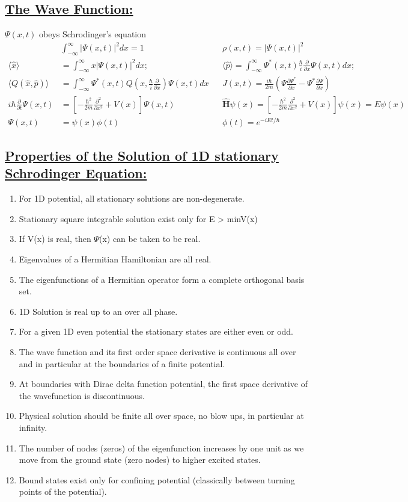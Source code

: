 \documentclass[a4paper,12pt]{article}
\begin{document}
\subsection*{\underline{The Wave Function:}}
$\Psi(x,t)$ obeys Schrodinger's equation
\begin{align*}
    &\int_{-\infty}^\infty |\Psi(x,t)|^2dx=1&& \rho(x,t)=|\Psi(x,t)|^2\\
    \langle \hat{x}\rangle&=\int_{-\infty}^\infty x|\Psi(x,t)|^2dx;&&\langle \hat{p}\rangle=\int_{-\infty}^\infty \Psi^*(x,t)\frac{\hbar}{i}\frac{\partial}{\partial x}\Psi(x,t)dx;\\
    \langle Q(\hat{x},\hat{p})\rangle&=\int_{-\infty}^\infty \Psi^*(x,t)Q(x,\frac{\hbar}{i}\frac{\partial}{\partial x})\Psi(x,t)dx&&J(x,t)=\frac{i\hbar}{2m}\left( \Psi\frac{\partial \Psi^*}{\partial x}-\Psi^*\frac{\partial \Psi}{\partial x} \right)\\
    i\hbar \frac{\partial }{\partial t}\Psi(x,t)&=\left[ -\frac{\hbar^2}{2m}\frac{\partial^2}{\partial x^2}+V(x) \right] \Psi(x,t)&&\mathbf{\hat{H}}\psi(x)=\left[ -\frac{\hbar^2}{2m}\frac{\partial^2}{\partial x^2}+V(x) \right] \psi(x)=E\psi(x)\\
    \Psi(x,t)&=\psi(x)\phi(t)&&\phi(t)=e^{-iEt/\hbar} 
\end{align*}
\subsection*{\underline{Properties of the Solution of 1D stationary Schrodinger Equation:}}

\begin{enumerate}
\item For 1D potential, all stationary solutions are non-degenerate.
\item Stationary square integrable solution exist only for E > min{V(x)} 
\item If V(x) is real, then $\Psi$(x) can be taken to be real.
\item Eigenvalues of a Hermitian Hamiltonian are all real.
\item The eigenfunctions of a Hermitian operator form a complete orthogonal basis set.
\item 1D Solution is real up to an over all phase.
\item For a given 1D even potential the stationary states are either even or odd.
\item The wave function and its first order space derivative is continuous all over and in particular at the boundaries of a finite potential.
\item At boundaries with Dirac delta function potential, the first space derivative of the wavefunction is discontinuous. 
\item Physical solution should be finite all over space, no blow ups, in particular at infinity.
\item The number of nodes (zeros) of the eigenfunction increases by one unit as we move from the ground state (zero nodes) to higher excited states.
\item Bound states exist only for confining potential (classically between turning points of the potential).
\end{enumerate}
\end{document}
